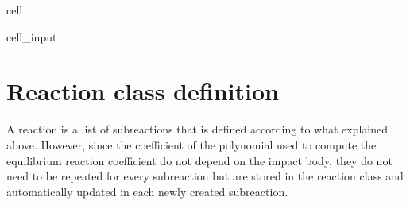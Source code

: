 \documentclass[letterpaper,10pt,english]{jupyterBook}
\begin{document}
\begin{sphinxuseclass}{cell}
\begin{sphinxVerbatimInput}
\begin{sphinxuseclass}{cell_input}
\begin{sphinxVerbatim}[commandchars=\\\{\}]
      
             
          \PYG{p}{[}\PYG{p}{]}  \PYG{p}{[}\PYG{p}{]}  \PYG{p}{[}\PYG{p}{]}  \PYG{p}{[}\PYG{p}{]}  \PYG{p}{[}\PYG{p}{]}
        
           
              
           
              
         
              
         
\end{sphinxVerbatim}

\end{sphinxuseclass}\end{sphinxVerbatimInput}

\end{sphinxuseclass}

\chapter{Reaction class definition}
\label{\detokenize{1_Temperature/Reaction_class_definition:reaction-class-definition}}
\sphinxAtStartPar
A reaction is a list of sub\sphinxhyphen{}reactions that is defined according to what explained above. However, since the coefficient of the polynomial used to compute the equilibrium reaction coefficient do not depend on the impact body, they do not need to be repeated for every sub\sphinxhyphen{}reaction but are stored in the reaction class and automatically updated in each newly created sub\sphinxhyphen{}reaction.
\end{document}
